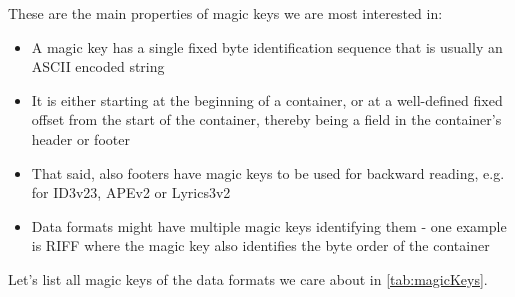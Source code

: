 These are the main properties of magic keys we are most interested in:
\begin{itemize}
\item A magic key has a single fixed byte identification sequence that is usually an ASCII encoded string
\item It is either starting at the beginning of a container, or at a well-defined fixed offset from the start of the container, thereby being a field in the container's header or footer
\item That said, also footers have magic keys to be used for backward reading, e.g. for ID3v23, APEv2 or Lyrics3v2
\item Data formats might have multiple magic keys identifying them - one example is RIFF where the magic key also identifies the byte order of the container
\end{itemize}

Let's list all magic keys of the data formats we care about in \ref{tab:magicKeys}.

